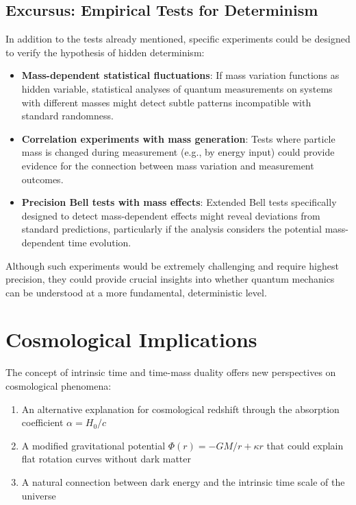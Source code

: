 \documentclass[12pt,a4paper]{article}  %
\begin{document}
	\subsection{Excursus: Empirical Tests for Determinism}
	
	In addition to the tests already mentioned, specific experiments could be designed to verify the hypothesis of hidden determinism:
	
	\begin{itemize}
		\item \textbf{Mass-dependent statistical fluctuations}: If mass variation functions as hidden variable, statistical analyses of quantum measurements on systems with different masses might detect subtle patterns incompatible with standard randomness.
		
		\item \textbf{Correlation experiments with mass generation}: Tests where particle mass is changed during measurement (e.g., by energy input) could provide evidence for the connection between mass variation and measurement outcomes.
		
		\item \textbf{Precision Bell tests with mass effects}: Extended Bell tests specifically designed to detect mass-dependent effects might reveal deviations from standard predictions, particularly if the analysis considers the potential mass-dependent time evolution.
	\end{itemize}
	
	Although such experiments would be extremely challenging and require highest precision, they could provide crucial insights into whether quantum mechanics can be understood at a more fundamental, deterministic level.
	
	\section{Cosmological Implications}
	
	The concept of intrinsic time and time-mass duality offers new perspectives on cosmological phenomena:
	
	\begin{enumerate}
		\item An alternative explanation for cosmological redshift through the absorption coefficient $\alpha = H_0/c$
		\item A modified gravitational potential $\Phi(r) = -GM/r + \kappa r$ that could explain flat rotation curves without dark matter
		\item A natural connection between dark energy and the intrinsic time scale of the universe
	\end{enumerate}
	
\end{document}
